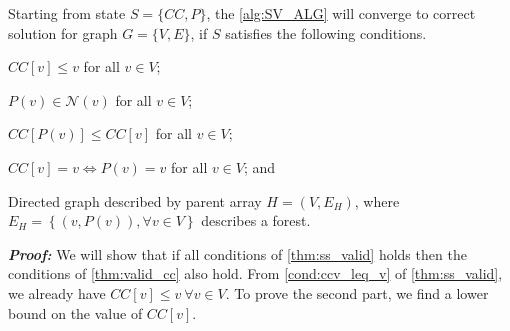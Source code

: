 \begin{thm}
\label{thm:ss_valid}
Starting from state $S= \{CC,P \}$, the \cref{alg:SV_ALG} will converge to correct solution for graph $G=\{ V, E\}$, if $S$ satisfies the following conditions.
\begin{conditionList}
\item \label{cond:ccv_leq_v} $CC[v]\leq v$  for all $v\in V$;
\item \label{cond:p_in_nv} $P(v)\in\mathcal{N}(v)$ for all $v\in V$;
\item \label{cond:cpv_leq_cv} $CC[P(v)]\leq CC[v]$ for all $v\in V$; 
\item \label{cond:crv_eq_rv} $CC[v] =v \iff P(v)=v$ for all $v\in V$; and 
\item \label{cond:h_is_fr} Directed graph described by parent array $H=(V,E_{H})$, where $E_{H}=\left\{ (v,P(v)),\forall v\in V\right\} $
describes a forest. 
\end{conditionList}
\end{thm}

\textbf{\emph{Proof:}}  We will show that if all conditions of
\cref{thm:ss_valid} holds then the conditions of \cref{thm:valid_cc} also
hold. From \cref{cond:ccv_leq_v} of \cref{thm:ss_valid}, we already have
$CC[v]\leq v\ \forall v \in V$. To prove the second part,  we find a lower
bound on the value of $CC[v]$.

